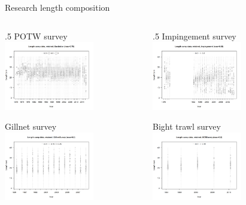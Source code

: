 \documentclass[ignorenonframetext,]{beamer}
\def\begincols{\begin{columns}}
\def\begincol{\begin{column}}
\def\endcol{\end{column}}
\def\endcols{\end{columns}}
\begin{document}
\begin{frame}{Research length composition}

\begincols
 \begincol{.5\textwidth} POTW survey
\includegraphics[height=3cm]{r4ss/plots_mod1/comp_lendat_bubflt7mkt2_page2.png}

Gillnet survey
\includegraphics[height=3cm]{r4ss/plots_mod1/comp_lendat_bubflt9mkt2.png}
\endcol
 \begincol{.5\textwidth} Impingement survey
\includegraphics[height=3cm]{r4ss/plots_mod1/comp_lendat_bubflt10mkt2.png}

Bight trawl survey
\includegraphics[height=3cm]{r4ss/plots_mod1/comp_lendat_bubflt11mkt2.png}
\endcol
\endcols

\end{frame}
\end{document}
